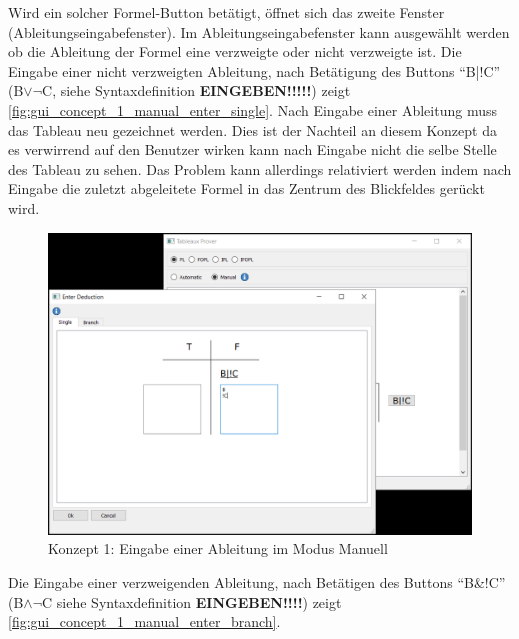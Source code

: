 Wird ein solcher Formel-Button betätigt, öffnet sich das zweite Fenster (Ableitungseingabefenster). Im Ableitungseingabefenster kann ausgewählt werden ob die Ableitung der Formel eine verzweigte oder nicht verzweigte ist. Die Eingabe einer nicht verzweigten Ableitung, nach Betätigung des Buttons \enquote{B|!C} (B$\vee\neg$C, siehe Syntaxdefinition \textbf{EINGEBEN!!!!!}) zeigt \autoref{fig:gui_concept_1_manual_enter_single}. Nach Eingabe einer Ableitung muss das Tableau neu gezeichnet werden. Dies ist der Nachteil an diesem Konzept da es verwirrend auf den Benutzer wirken kann nach Eingabe nicht die selbe Stelle des Tableau zu sehen. Das Problem kann allerdings relativiert werden indem nach Eingabe die zuletzt abgeleitete Formel in das Zentrum des Blickfeldes gerückt wird.

\begin{figure}[h]
\begin{center}
\includegraphics[scale=0.7]{images/gui_concept_1_manual_enter_single.png}
\caption{Konzept 1: Eingabe einer Ableitung im Modus Manuell}
\label{fig:gui_concept_1_manual_enter_single}
\end{center}
\end{figure}

Die Eingabe einer verzweigenden Ableitung, nach Betätigen des Buttons \enquote{B\&!C} (B$\wedge\neg$C siehe Syntaxdefinition \textbf{EINGEBEN!!!!}) zeigt \autoref{fig:gui_concept_1_manual_enter_branch}.

